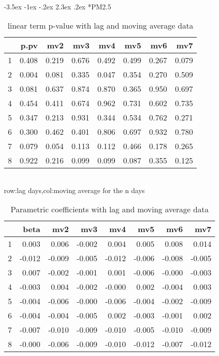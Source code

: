 \documentclass[a4paper, 12pt]{article}
\makeatletter
\def\large{\fontsize{14}{20}\selectfont}
\renewcommand\subsection{\@startsection {subsection}{1}{\z@}%
                                   {-3.5ex \@plus -1ex \@minus -.2ex}%
                                   {2.3ex \@plus.2ex}%
                                   {\centering\normalfont\large\bfseries}}
\makeatother
\begin{document}
\clearpage
\subsection*{PM2.5}
\begin{table}[h]
\centering
\caption{linear term p-value with lag and moving average data}
\begin{tabular}{rrrrrrrr}
  \hline
 & p.pv & mv2 & mv3 & mv4 & mv5 & mv6 & mv7 \\
  \hline
1 & 0.408 & 0.219 & 0.676 & 0.492 & 0.499 & 0.267 & 0.079 \\
  2 & 0.004 & 0.081 & 0.335 & 0.047 & 0.354 & 0.270 & 0.509 \\
  3 & 0.081 & 0.637 & 0.874 & 0.870 & 0.365 & 0.950 & 0.697 \\
  4 & 0.454 & 0.411 & 0.674 & 0.962 & 0.731 & 0.602 & 0.735 \\
  5 & 0.347 & 0.213 & 0.931 & 0.344 & 0.534 & 0.762 & 0.271 \\
  6 & 0.300 & 0.462 & 0.401 & 0.806 & 0.697 & 0.932 & 0.780 \\
  7 & 0.079 & 0.054 & 0.113 & 0.112 & 0.466 & 0.178 & 0.265 \\
  8 & 0.922 & 0.216 & 0.099 & 0.099 & 0.087 & 0.355 & 0.125 \\
   \hline
\end{tabular}
\\row:lag days,col:moving average for the n days
\end{table}

\begin{table}[h]
\centering
\caption{Parametric coefficients with lag and moving average data}
\begin{tabular}{rrrrrrrr}
  \hline
 & beta & mv2 & mv3 & mv4 & mv5 & mv6 & mv7 \\
  \hline
1 & 0.003 & 0.006 & -0.002 & 0.004 & 0.005 & 0.008 & 0.014 \\
  2 & -0.012 & -0.009 & -0.005 & -0.012 & -0.006 & -0.008 & -0.005 \\
  3 & 0.007 & -0.002 & -0.001 & 0.001 & -0.006 & -0.000 & -0.003 \\
  4 & -0.003 & 0.004 & -0.002 & -0.000 & 0.002 & -0.004 & 0.003 \\
  5 & -0.004 & -0.006 & -0.000 & -0.006 & -0.004 & -0.002 & -0.009 \\
  6 & -0.004 & -0.004 & -0.005 & 0.002 & -0.003 & -0.001 & 0.002 \\
  7 & -0.007 & -0.010 & -0.009 & -0.010 & -0.005 & -0.010 & -0.009 \\
  8 & -0.000 & -0.006 & -0.009 & -0.010 & -0.012 & -0.007 & -0.012 \\
   \hline
\end{tabular}
\end{table}
\clearpage
\end{document}
